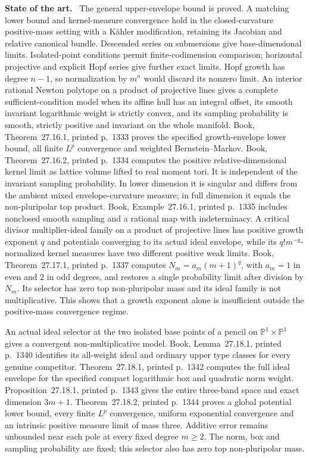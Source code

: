 \documentclass[11pt]{article}
\newcommand{\field}[1]{\par\medskip\noindent\textbf{#1.}\ }
\begin{document}
\field{State of the art} The general upper-envelope bound is proved. A matching lower bound and kernel-measure convergence hold in the closed-curvature positive-mass setting with a K\"ahler modification, retaining its Jacobian and relative canonical bundle. Descended series on submersions give base-dimensional limits. Isolated-point conditions permit finite-codimension comparison; horizontal projective and explicit Hopf series give further exact limits. Hopf growth has degree $n-1$, so normalization by $m^n$ would discard its nonzero limit. An interior rational Newton polytope on a product of projective lines gives a complete sufficient-condition model when its affine hull has an integral offset, its smooth invariant logarithmic weight is strictly convex, and its sampling probability is smooth, strictly positive and invariant on the whole manifold. Book, Theorem~27.16.1, printed p.~1333 proves the specified growth-envelope lower bound, all finite $L^p$ convergence and weighted Bernstein--Markov. Book, Theorem~27.16.2, printed p.~1334 computes the positive relative-dimensional kernel limit as lattice volume lifted to real moment tori. It is independent of the invariant sampling probability. In lower dimension it is singular and differs from the ambient mixed envelope-curvature measure; in full dimension it equals the non-pluripolar top product. Book, Example~27.16.1, printed p.~1335 includes nonclosed smooth sampling and a rational map with indeterminacy. A critical divisor multiplier-ideal family on a product of projective lines has positive growth exponent $q$ and potentials converging to its actual ideal envelope, while its $q!m^{-q}$-normalized kernel measures have two different positive weak limits. Book, Theorem~27.17.1, printed p.~1337 computes $N_m=a_m(m+1)^q$, with $a_m=1$ in even and $2$ in odd degrees, and restores a single probability limit after division by $N_m$. Its selector has zero top non-pluripolar mass and its ideal family is not multiplicative. This shows that a growth exponent alone is insufficient outside the positive-mass convergence regime.\par An actual ideal selector at the two isolated base points of a pencil on $\mathbb P^1\times\mathbb P^1$ gives a convergent non-multiplicative model. Book, Lemma~27.18.1, printed p.~1340 identifies its all-weight ideal and ordinary upper type classes for every genuine competitor. Theorem~27.18.1, printed p.~1342 computes the full ideal envelope for the specified compact logarithmic box and quadratic norm weight. Proposition~27.18.1, printed p.~1343 gives the entire three-band space and exact dimension $3m+1$. Theorem~27.18.2, printed p.~1344 proves a global potential lower bound, every finite $L^p$ convergence, uniform exponential convergence and an intrinsic positive measure limit of mass three. Additive error remains unbounded near each pole at every fixed degree $m\geq2$. The norm, box and sampling probability are fixed; this selector also has zero top non-pluripolar mass.
\end{document}
